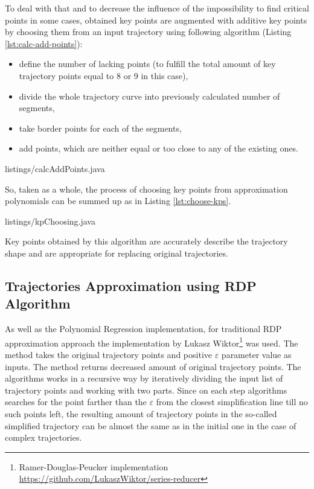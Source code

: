 To deal with that and to decrease the influence of the impossibility to find critical points in some cases, obtained key points are augmented with additive key points by choosing them from an input trajectory using following algorithm (Listing \ref{lst:calc-add-points}):

\begin{itemize}
	\setlength\itemsep{0em}
	\item define the number of lacking points (to fulfill the total amount of key trajectory points equal to 8 or 9 in this case),
	\item divide the whole trajectory curve into previously calculated number of segments,
	\item take border points for each of the segments,
	\item add points, which are neither equal or too close to any of the existing ones.
\end{itemize}

 {listings/calcAddPoints.java}

So, taken as a whole, the process of choosing key points from approximation polynomials can be summed up as in Listing \ref{lst:choose-kps}.

 {listings/kpChoosing.java}

Key points obtained by this algorithm are accurately describe the trajectory shape and are appropriate for replacing original trajectories.

\subsection{Trajectories Approximation using RDP Algorithm}

As well as the Polynomial Regression implementation, for traditional RDP approximation approach the implementation by Lukasz Wiktor\footnote{Ramer-Douglas-Peucker implementation \url{https://github.com/LukaszWiktor/series-reducer}} was used. The method takes the original trajectory points and positive $\varepsilon$ parameter value as inputs. The method returns decreased amount of original trajectory points. The algorithms works in a recursive way by iteratively dividing the input list of trajectory points and working with two parts. Since on each step algorithms searches for the point farther than the $\varepsilon$ from the closest simplification line till no such points left, the resulting amount of trajectory points in the so-called simplified trajectory can be almost the same as in the initial one in the case of complex trajectories.

